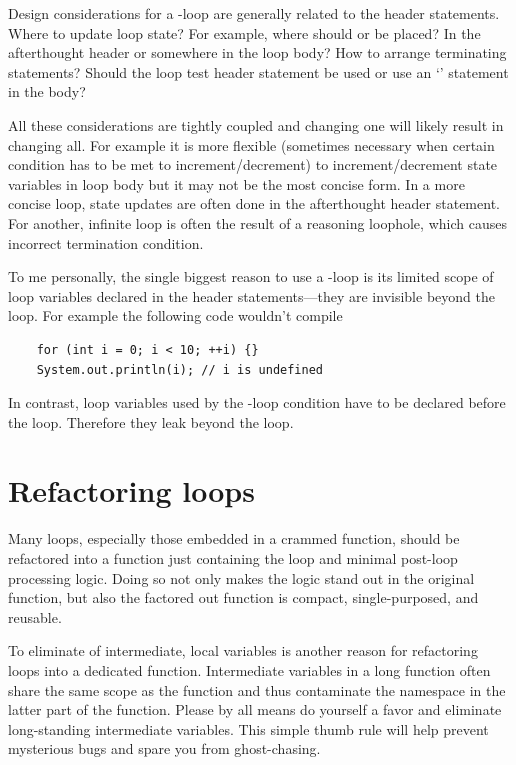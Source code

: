 Design considerations for a -loop are generally related to the header statements.
Where to update loop state?
For example, where should  or  be placed?
In the afterthought header or somewhere in the loop body?
How to arrange terminating statements?
Should the loop test header statement be used or use an `' statement in the body?


All these considerations are tightly coupled and changing one will likely result in changing all.
For example it is more flexible (sometimes necessary when certain condition
has to be met to increment/decrement)
to increment/decrement state variables in loop body but it may not be the most concise form.
In a more concise loop, state updates are often done in the afterthought header statement.
For another, infinite loop is often the result of a reasoning loophole,
which causes incorrect termination condition.


To me personally, the single biggest reason to use a -loop is its limited scope of
loop variables declared in the  header statements---they are invisible beyond the loop.
For example the following code wouldn't compile
\begin{lstlisting}
    for (int i = 0; i < 10; ++i) {}
    System.out.println(i); // i is undefined
\end{lstlisting}
In contrast, loop variables used by the -loop condition have to be declared
before the loop.
Therefore they leak beyond the loop.




\section{Refactoring loops}\label{sec:refactoringLoops}

Many loops, especially those embedded in a crammed function, should be
refactored into a function just containing the loop and minimal post-loop processing logic.
Doing so not only makes the logic stand out in the original function,
but also the factored out function is compact, single-purposed, and reusable.

To eliminate of intermediate, local variables is another reason for refactoring loops into a
dedicated function.
Intermediate variables in a long function often share the same scope as the function
and thus contaminate the namespace in the latter part of the function.
Please by all means do yourself a favor and eliminate long-standing intermediate variables.
This simple thumb rule will help prevent mysterious bugs and spare you from ghost-chasing.


